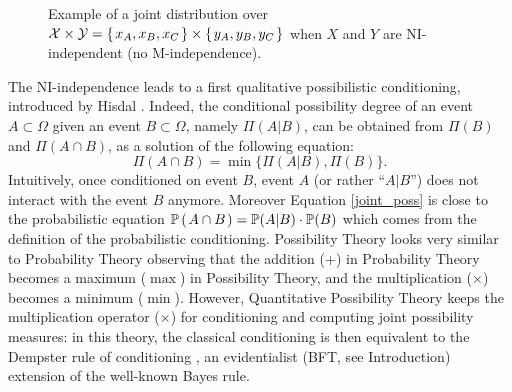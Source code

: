 \begin{figure}
\caption[Joint possibility distribution with NI-independence]{Example of a joint distribution over $\mathcal{X} \times \mathcal{Y} = \left\{ \left. x_A,x_B,x_C \right. \right\} \times  \left\{ \left. y_A,y_B,y_C \right. \right\}$ when $X$ and $Y$ are NI-independent
(no M-independence).} 
\label{figure_NIindep} 
\end{figure}



The NI-independence leads to a first qualitative possibilistic conditioning,
introduced by Hisdal \cite{Hisdal1978283}.
Indeed, the conditional possibility degree of an event $A \subset \Omega$ 
given an event $B \subset \Omega$,
namely $\Pi(A \vert B)$, can be obtained from $\Pi(B)$ and $\Pi(A \cap B)$,
as a solution of the following equation:
\begin{equation}
\label{joint_poss}
\Pi(A \cap B) = \min \Big\{ \Pi (A \vert B) , \Pi(B)  \Big\}.
\end{equation}
Intuitively, once conditioned on event $B$,
event $A$ (or rather ``$A \vert B$'') 
does not interact with the event $B$ anymore.
Moreover Equation \ref{joint_poss} is close to the probabilistic equation 
$\mathbb{P} \left( \left.  A \cap B  \right. \right) = \mathbb{P} (A \vert B) \cdot \mathbb{P} (B) $
which comes from the definition of the probabilistic conditioning.
Possibility Theory looks very similar to Probability Theory
observing that the addition ($+$) in Probability Theory becomes a maximum ($\max$)
in Possibility Theory, and the multiplication ($\times$)
becomes a minimum ($\min$). 
However, Quantitative Possibility Theory keeps the multiplication operator ($\times$)
for conditioning and computing joint possibility measures:
in this theory, the classical conditioning is then
equivalent to the Dempster rule of conditioning \cite{dempster1967},
an evidentialist (BFT, see Introduction) 
extension of the well-known Bayes rule.

